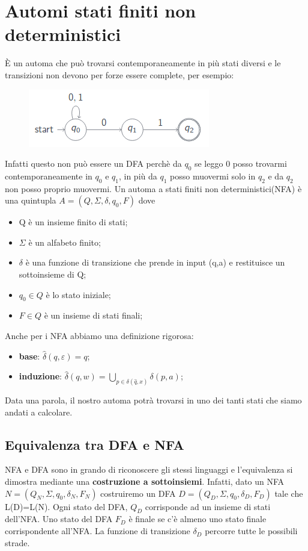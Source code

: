\chapter{Automi stati finiti non deterministici}
È un automa che può trovarsi contemporaneamente in più stati diversi e le 
transizioni non devono per forze essere complete, per esempio: 

\begin{figure}[h]
\centering 
\includegraphics[scale=0.5]{Immagini/NFA.png}
\end{figure}

Infatti questo non può essere un DFA perchè da $q_0$ se leggo 0 posso trovarmi
contemporaneamente in $q_0$ e $q_1$, in più da $q_1$ posso muovermi solo in $q_2$ 
e da $q_2$ non posso proprio muovermi.
Un automa a stati finiti non deterministici(NFA) è una quintupla $A=(Q, \Sigma, 
\delta, q_0, F)$ dove
\begin{itemize}
\item Q è un insieme finito di stati;
\item $\Sigma$ è un alfabeto finito;
\item $\delta$ è una funzione di transizione che prende in input (q,a) e 
restituisce un sottoinsieme di Q;
\item $q_0 \in Q$ è lo stato iniziale;
\item $F \in Q$ è un insieme di stati finali;
\end{itemize}
Anche per i NFA abbiamo una definizione rigorosa:
\begin{itemize}
\item \textbf{base}: $\widehat{\delta}(q, \varepsilon)={q}$;
\item \textbf{induzione}: $\widehat{\delta}(q,w)=\bigcup_{p \in \delta 
(\widehat{q},x)}^{} \delta(p,a)$;
\end{itemize}
Data una parola, il nostro automa potrà trovarsi in uno dei tanti stati
che siamo andati a calcolare.

\section{Equivalenza tra DFA e NFA}
NFA e DFA sono in grando di riconoscere gli stessi linguaggi e l'equivalenza si
dimostra mediante una \textbf{costruzione a sottoinsiemi}. Infatti, dato un NFA
$N=(Q_N, \Sigma, q_0, \delta_N, F_N)$ costruiremo un DFA $D=(Q_D, \Sigma, {q_0}, 
\delta_D, F_D)$ tale che L(D)=L(N).
Ogni stato del DFA, $Q_D$ corrisponde ad un insieme di stati dell'NFA.
Uno stato del DFA $F_D$ è finale se c'è almeno uno stato finale corrispondente
all'NFA. La funzione di transizione $\delta_D$ percorre tutte le possibili strade.


